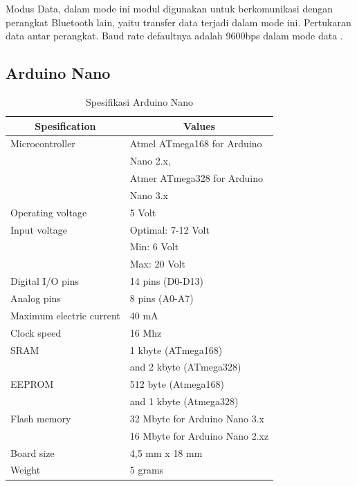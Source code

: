 Modus Data,
dalam mode ini modul digunakan untuk berkomunikasi dengan perangkat Bluetooth lain, yaitu transfer data terjadi dalam mode ini. Pertukaran data antar perangkat. Baud rate defaultnya adalah 9600bps dalam mode data \cite{cit:20}.

\vspace{1ex}


\subsection{Arduino Nano}
\vspace{1ex}


  \begin{table}[h]
 	\begin{tabular}{|l|l|}
 		
 		\hline
 		\multicolumn{1}{|c|}{{\color[HTML]{000000} \textbf{Spesification}}} & \multicolumn{1}{c|}{\textbf{Values}} \\ \hline
 		Microcontroller & Atmel ATmega168 for Arduino \\& Nano 2.x,  \\ 
 		& Atmer ATmega328 for Arduino \\& Nano 3.x \\ \hline
 		Operating voltage & 5 Volt \\ \hline
 		Input voltage & Optimal: 7-12 Volt \\& Min: 6 Volt\\& Max: 20 Volt \\ \hline
 		Digital I/O pins & 14 pins (D0-D13) \\ \hline
 		Analog pins & 8 pins (A0-A7) \\ \hline
 		Maximum electric current & 40 mA \\ \hline
 		Clock speed & 16 Mhz \\ \hline
 		SRAM &  1 kbyte (ATmega168) \\& and 2 kbyte (ATmega328) \\ \hline
 		EEPROM & 512 byte (Atmega168) \\& and 1 kbyte (Atmega328) \\ \hline
 		Flash memory & 32 Mbyte for Arduino Nano 3.x
 		
 		\\& 16 Mbyte for Arduino Nano 2.xz \\ \hline
 		Board size & 4,5 mm x 18 mm \\ \hline
 		Weight & 5 grams \\ \hline	
 		
 	\end{tabular}
 	\vspace{1ex}
 	\caption{Spesifikasi Arduino Nano \cite{cit:19}}
 	\label{tabel:2.0}
 \end{table}
